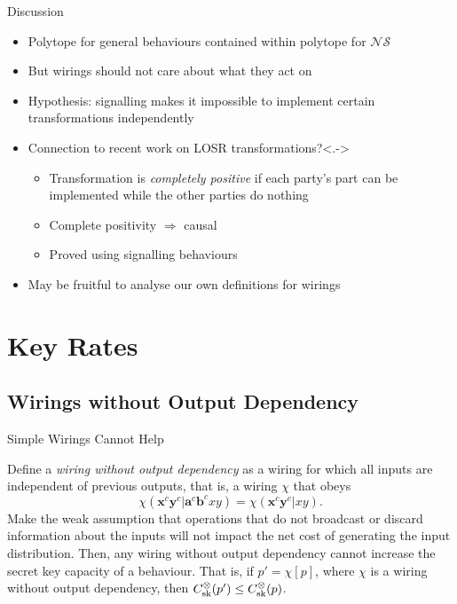 \documentclass[xcolor=dvipsnames]{beamer}
\newcommand{\?}{\mathrel{?}} %
\newcommand{\cvec}[1]{\boldsymbol{\mathbf{#1}}}    %
\newcommand{\NSs}{\mathcal{NS}}
\newcommand{\sk}{\rm sk}
\begin{document}
\begin{frame}{Discussion}
  \begin{itemize}[<+->]
    \item Polytope for general behaviours contained within polytope for \(\NSs\)
    \item But wirings should not care about what they act on
    \item Hypothesis: signalling makes it impossible to implement certain transformations independently
    \item Connection to recent work on LOSR transformations?\only<.->{}
      \begin{itemize}
        \item Transformation is \emph{completely positive} if each party's part can be implemented while the other parties do nothing
        \item Complete positivity \(\Rightarrow\) causal
        \item Proved using signalling behaviours
      \end{itemize}
    \item May be fruitful to analyse our own definitions for wirings
  \end{itemize}
\end{frame}


\section{Key Rates}

\subsection{Wirings without Output Dependency}

\begin{frame}{Simple Wirings Cannot Help}
  \begin{lemma}
    Define a \emph{wiring without output dependency} as a wiring for which all inputs are independent of previous outputs, that is, a wiring \(\chi\) that obeys
    \[
      \chi(\cvec{x}^c\cvec{y}^c|\cvec{a}^c\cvec{b}^cxy) = \chi(\cvec{x}^c\cvec{y}^c|xy).
    \]
    Make the weak assumption that operations that do not broadcast or discard information about the inputs will not impact the net cost of generating the input distribution. Then, any wiring without output dependency cannot increase the secret key capacity of a behaviour. That is, if \(p' = \chi[p]\), where \(\chi\) is a wiring without output dependency, then \(C_{\sk}^{\otimes}(p') \leq C_{\sk}^{\otimes}(p)\).
  \end{lemma}
\end{frame}
\end{document}
